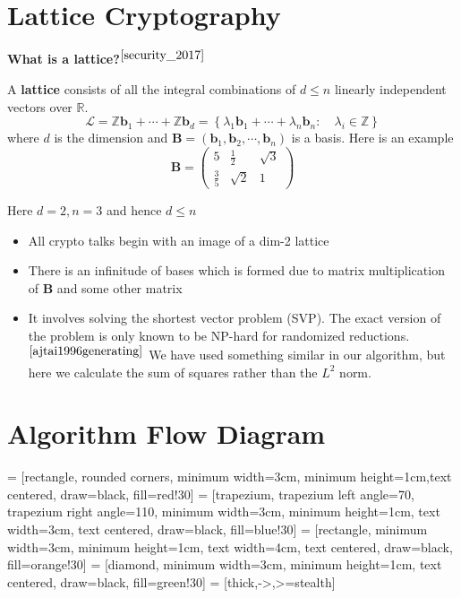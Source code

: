 \documentclass[a4paper,12pt]{article}
\begin{document}
\section{Lattice Cryptography}
\textbf{What is a lattice?}$^{\cite{security_2017}}$
\begin{flushleft}
A \textbf{lattice} consists of all the integral combinations of $d\le n$ linearly independent vectors over $\mathbb{R}$. $$\mathcal{L}=\mathbb{Z}\textbf{b}_1+\cdots+\mathbb{Z}\textbf{b}_d=\left\{\lambda_1\textbf{b}_1+\cdots+\lambda_n\textbf{b}_n:\quad \lambda_i\in\mathbb{Z}\right\}$$ where $d$ is the dimension and $\textbf{B}=\left(\textbf{b}_1,\textbf{b}_2,\cdots,\textbf{b}_n\right)$ is a basis. Here is an example $$\textbf{B}=\left(\begin{array}{ccc}5&\frac{1}{2}&\sqrt{3}\\\frac{3}{5}&\sqrt{2}&1
\end{array}\right)$$

Here $d=2,n=3$ and hence $d\le n$
\end{flushleft}

\begin{itemize}
	\item All crypto talks begin with an image of a dim-2 lattice
	\item There is an infinitude of bases which is formed due to matrix multiplication of \textbf{B} and some other matrix
	\item It involves solving the shortest vector problem (SVP). The exact version of the problem is only known to be NP-hard for randomized reductions.$^{\cite{ajtai1996generating}}$ We have used something similar in our algorithm, but here we calculate the sum of squares rather than the $L^2$ norm.
\end{itemize}
\section{Algorithm Flow Diagram}
 = [rectangle, rounded corners, minimum width=3cm, minimum height=1cm,text centered, draw=black, fill=red!30]
 = [trapezium, trapezium left angle=70, trapezium right angle=110, minimum width=3cm, minimum height=1cm, text width=3cm, text centered, draw=black, fill=blue!30]
 = [rectangle, minimum width=3cm, minimum height=1cm, text width=4cm, text centered, draw=black, fill=orange!30]
 = [diamond, minimum width=3cm, minimum height=1cm, text centered, draw=black, fill=green!30]
 = [thick,->,>=stealth]
\end{document}
